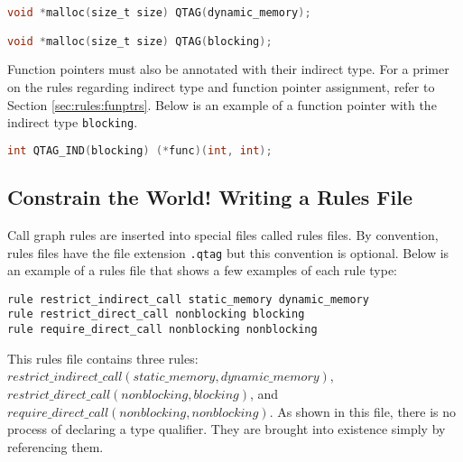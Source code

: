 \noindent\begin{minipage}[t]{\linewidth}
\begin{lstlisting}[language=C]
void *malloc(size_t size) QTAG(dynamic_memory);

void *malloc(size_t size) QTAG(blocking);
\end{lstlisting}
\end{minipage}

Function pointers must also be annotated with their indirect type.  For a primer on the rules regarding indirect type and function pointer assignment, refer to Section \ref{sec:rules:funptrs}.  Below is an example of a function pointer with the indirect type \lstinline{blocking}.

\noindent\begin{minipage}[t]{\linewidth}
\begin{lstlisting}[language=C++]
int QTAG_IND(blocking) (*func)(int, int);
\end{lstlisting}
\end{minipage}

\subsection{Constrain the World!  Writing a Rules File}\label{sec:operate:rules}

Call graph rules are inserted into special files called rules files.  By convention, rules files have the file extension \lstinline{.qtag} but this convention is optional.  Below is an example of a rules file that shows a few examples of each rule type:

\noindent\begin{minipage}[t]{\linewidth}
\begin{lstlisting}
rule restrict_indirect_call static_memory dynamic_memory
rule restrict_direct_call nonblocking blocking
rule require_direct_call nonblocking nonblocking
\end{lstlisting}
\end{minipage}

\begin{sloppypar}
This rules file contains three rules: $restrict\_indirect\_call(\allowbreak static\_memory,\allowbreak dynamic\_memory)$, $restrict\_direct\_call(\allowbreak nonblocking,\allowbreak blocking)$, and $require\_direct\_call(\allowbreak nonblocking,\allowbreak nonblocking)$.  As shown in this file, there is no process of declaring a type qualifier.  They are brought into existence simply by referencing them.  
\end{sloppypar}

